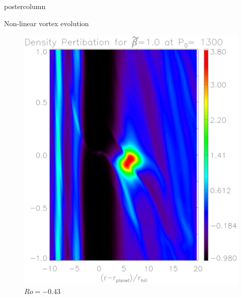 \documentclass[final,hyperref={pdfpagelabels=false}]{beamer}
\begin{document}
\begin{frame}
\begin{columns}
\begin{column}{.49\textwidth}
\begin{beamercolorbox}[center,wd=\textwidth]{postercolumn}
\begin{minipage}[T]{.95\textwidth}
{\begin{block}{\Large{Non-linear vortex evolution}}
\begin{figure}
\begin{minipage}{0.3\textwidth}
                      \includegraphics[width=\textwidth]{Posterfig_During}
                      \caption{$Ro=-0.43$}
                    \end{minipage}
                    \hfill
                    \begin{minipage}{0.3\textwidth}

\end{minipage}
\end{figure}
\end{block}}
\end{minipage}
\end{beamercolorbox}
\end{column}
\end{columns}
\end{frame}
\end{document}
